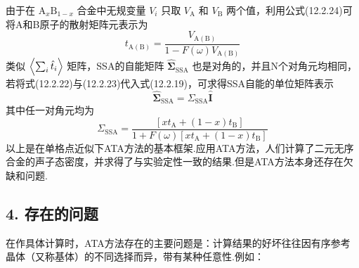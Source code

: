 由于在 $\mathrm{A}_{x}\mathrm{B}_{1-x}$ 合金中无规变量 $V_{i}$ 只取 $V_{\mathrm{A}}$ 和 $V_{\mathrm{B}}$ 两个值，利用公式(12.2.24)可将A和B原子的散射矩阵元表示为
\begin{equation}
  t_{\mathrm{A}(\mathrm{B})}=\frac{V_{\mathrm{A}(\mathrm{B})}}{1-F\left(\omega\right)V_{\mathrm{A}(\mathrm{B})}}
\end{equation}
类似 $\Bigl\langle\sum_{i}\hat{t}_{i}\Bigr\rangle$ 矩阵，SSA的自能矩阵 $\hat{\boldsymbol{\Sigma}}_{\mathrm{SSA}}$ 也是对角的，并且N个对角元均相同，若将式(12.2.22)与(12.2.23)代入式(12.2.19)，可求得SSA自能的单位矩阵表示
\begin{equation}
  \hat{\boldsymbol{\Sigma}}_{\mathrm{SSA}}=\Sigma_{\mathrm{SSA}}\hat{\boldsymbol{I}}
\end{equation}
其中任一对角元均为
\begin{equation}
  \Sigma_{\mathrm{SSA}}=\frac{\left[xt_{\mathrm{A}}+\left(1-x\right)t_{\mathrm{B}}\right]}
  {1+F\left(\omega\right)\left[xt_{\mathrm{A}}+\left(1-x\right)t_{\mathrm{B}}\right]}
\end{equation}
以上是在单格点近似下ATA方法的基本框架.应用ATA方法，人们计算了二元无序合金的声子态密度，并求得了与实验定性一致的结果.但是ATA方法本身还存在欠缺和问题.

\subsection*{4. 存在的问题}

在作具体计算时，ATA方法存在的主要问题是：计算结果的好坏往往因有序参考晶体（又称基体）的不同选择而异，带有某种任意性.例如：


